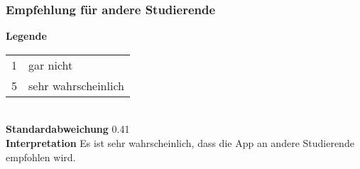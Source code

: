 \begin{frame}\frametitle{Empfehlung für andere Studierende}
    \begin{minipage}{\textwidth}
        \begin{minipage}{.49\textwidth}
        \end{minipage}
        \begin{minipage}{.49\textwidth}
            \textbf{Legende} 
            \begin{tabular}{l l}
                1 & gar nicht \\
                5 & sehr wahrscheinlich
            \end{tabular} \\
            \textbf{Standardabweichung}
            0.41 \\
            \textbf{Interpretation}
            Es ist sehr wahrscheinlich, dass die App an andere Studierende empfohlen wird.
        \end{minipage}
    \end{minipage}
\end{frame}
